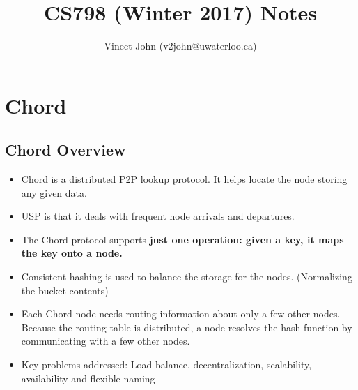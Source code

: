 \documentclass[parskip=half]{scrartcl}
\begin{document}
\title{CS798 (Winter 2017) Notes}
\author{Vineet John (v2john@uwaterloo.ca)}
\date{}
\maketitle

\section{Chord} %
\label{sec:chord}

    \subsection{Chord Overview} %
    \label{sub:chord_overview}

    \begin{itemize}
        \item
        Chord is a distributed P2P lookup protocol. It helps locate the node storing any given data.
        \item
        USP is that it deals with frequent node arrivals and departures.
        \item
        The Chord protocol supports \textbf{just one operation: given a key, it maps the key onto a node.}
        \item
        Consistent hashing is used to balance the storage for the nodes. (Normalizing the bucket contents)
        \item
        Each Chord node needs routing information about only a few other nodes. Because the routing table is distributed, a node resolves the hash function by communicating with a few other nodes.
        \item
        Key problems addressed: Load balance, decentralization, scalability, availability and flexible naming
    \end{itemize}

\end{document}

